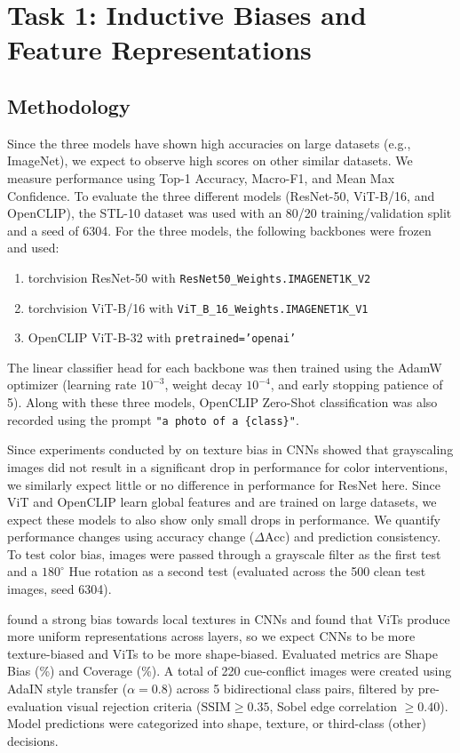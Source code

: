 \documentclass{article}
\begin{document}
\section{Task 1: Inductive Biases and Feature Representations}
\label{sec:task1}

\subsection{Methodology}
Since the three models have shown high accuracies on large datasets (e.g., ImageNet), we expect to observe high scores on other similar datasets. We measure performance using Top-1 Accuracy, Macro-F1, and Mean Max Confidence. To evaluate the three different models (ResNet-50, ViT-B/16, and OpenCLIP), the STL-10 dataset was used with an 80/20 training/validation split and a seed of 6304. For the three models, the following backbones were frozen and used:
\begin{enumerate}
    \item torchvision ResNet-50 with \texttt{ResNet50\_Weights.IMAGENET1K\_V2}
    \item torchvision ViT-B/16 with \texttt{ViT\_B\_16\_Weights.IMAGENET1K\_V1}
    \item OpenCLIP ViT-B-32 with \texttt{pretrained='openai'}
\end{enumerate}
The linear classifier head for each backbone was then trained using the AdamW optimizer (learning rate $10^{-3}$, weight decay $10^{-4}$, and early stopping patience of 5). Along with these three models, OpenCLIP Zero-Shot classification was also recorded using the prompt \texttt{"a photo of a \{class\}"}.

Since experiments conducted by \citet{geirhos2019imagenet} on texture bias in CNNs showed that grayscaling images did not result in a significant drop in performance for color interventions, we similarly expect little or no difference in performance for ResNet here. Since ViT and OpenCLIP learn global features and are trained on large datasets, we expect these models to also show only small drops in performance. We quantify performance changes using accuracy change ($\Delta \text{Acc}$) and prediction consistency. To test color bias, images were passed through a grayscale filter as the first test and a $180^\circ$ Hue rotation as a second test (evaluated across the 500 clean test images, seed 6304).

\citet{geirhos2019imagenet} found a strong bias towards local textures in CNNs and \citet{raghu2021vision} found that ViTs produce more uniform representations across layers, so we expect CNNs to be more texture-biased and ViTs to be more shape-biased. Evaluated metrics are Shape Bias (\%) and Coverage (\%). A total of 220 cue-conflict images were created using AdaIN style transfer ($\alpha=0.8$) across 5 bidirectional class pairs, filtered by pre-evaluation visual rejection criteria ($\text{SSIM} \ge 0.35$, Sobel edge correlation $\ge 0.40$). Model predictions were categorized into shape, texture, or third-class (other) decisions.
\end{document}

